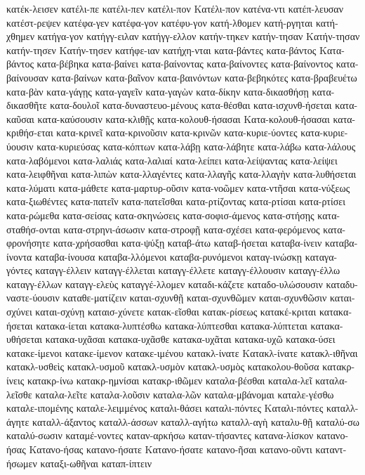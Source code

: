 {κατέκ-λεισεν
κατέλι-πε
κατέλι-πεν
κατέλι-πον
Κατέλι-πον
κατένα-ντι
κατέπ-λευσαν
κατέστ-ρεψεν
κατέφα-γεν
κατέφα-γον
κατέφυ-γον
κατή-λθομεν
κατή-ργηται
κατή-χθημεν
κατήγα-γον
κατήγγ-ειλαν
κατήγγ-ελλον
κατήν-τηκεν
κατήν-τησαν
Κατήν-τησαν
κατήν-τησεν
Κατήν-τησεν
κατήφε-ιαν
κατήχη-νται
κατα-βάντες
κατα-βάντος
Κατα-βάντος
κατα-βέβηκα
κατα-βαίνει
κατα-βαίνοντας
κατα-βαίνοντες
κατα-βαίνοντος
κατα-βαίνουσαν
κατα-βαίνων
κατα-βαῖνον
κατα-βαινόντων
κατα-βεβηκότες
κατα-βραβευέτω
κατα-βὰν
κατα-γάγῃς
κατα-γαγεῖν
κατα-γαγὼν
κατα-δίκην
κατα-δικασθήσῃ
κατα-δικασθῆτε
κατα-δουλοῖ
κατα-δυναστευο-μένους
κατα-θέσθαι
κατα-ισχυνθ-ήσεται
κατα-καῦσαι
κατα-καύσουσιν
κατα-κλιθῇς
κατα-κολουθ-ήσασαι
Κατα-κολουθ-ήσασαι
κατα-κριθήσ-εται
κατα-κρινεῖ
κατα-κρινοῦσιν
κατα-κρινῶν
κατα-κυριε-ύοντες
κατα-κυριε-ύουσιν
κατα-κυριεύσας
κατα-κόπτων
κατα-λάβῃ
κατα-λάβητε
κατα-λάβω
κατα-λάλους
κατα-λαβόμενοι
κατα-λαλιάς
κατα-λαλιαί
κατα-λείπει
κατα-λείψαντας
κατα-λείψει
κατα-λειφθῆναι
κατα-λιπὼν
κατα-λλαγέντες
κατα-λλαγῆς
κατα-λλαγὴν
κατα-λυθήσεται
κατα-λύματι
κατα-μάθετε
κατα-μαρτυρ-οῦσιν
κατα-νοῶμεν
κατα-ντῆσαι
κατα-νύξεως
κατα-ξιωθέντες
κατα-πατεῖν
κατα-πατεῖσθαι
κατα-ρτίζοντας
κατα-ρτίσαι
κατα-ρτίσει
κατα-ρώμεθα
κατα-σείσας
κατα-σκηνώσεις
κατα-σοφισ-άμενος
κατα-στήσῃς
κατα-σταθήσ-ονται
κατα-στρηνι-άσωσιν
κατα-στροφῇ
κατα-σχέσει
κατα-φερόμενος
κατα-φρονήσητε
κατα-χρήσασθαι
κατα-ψύξῃ
καταβ-άτω
καταβ-ήσεται
καταβα-ίνειν
καταβα-ίνοντα
καταβα-ίνουσα
καταβα-λλόμενοι
καταβα-ρυνόμενοι
καταγ-ινώσκῃ
καταγα-γόντες
καταγγ-έλλειν
καταγγ-έλλεται
καταγγ-έλλετε
καταγγ-έλλουσιν
καταγγ-έλλω
καταγγ-έλλων
καταγγ-ελεὺς
καταγγέ-λλομεν
καταδι-κάζετε
καταδο-υλώσουσιν
καταδυ-ναστε-ύουσιν
καταθε-ματίζειν
καται-σχυνθῇ
καται-σχυνθῶμεν
καται-σχυνθῶσιν
καται-σχύνει
καται-σχύνῃ
καταισ-χύνετε
κατακ-εῖσθαι
κατακ-ρίσεως
κατακέ-κριται
κατακα-ήσεται
κατακα-ίεται
κατακα-λυπτέσθω
κατακα-λύπτεσθαι
κατακα-λύπτεται
κατακα-υθήσεται
κατακα-υχᾶσαι
κατακα-υχᾶσθε
κατακα-υχᾶται
κατακα-υχῶ
κατακα-ύσει
κατακε-ίμενοι
κατακε-ίμενον
κατακε-ιμένου
κατακλ-ίνατε
Κατακλ-ίνατε
κατακλ-ιθῆναι
κατακλ-υσθεὶς
κατακλ-υσμοῦ
κατακλ-υσμὸν
κατακλ-υσμὸς
κατακολου-θοῦσα
κατακρ-ίνεις
κατακρ-ίνω
κατακρ-ημνίσαι
κατακρ-ιθῶμεν
καταλα-βέσθαι
καταλα-λεῖ
καταλα-λεῖσθε
καταλα-λεῖτε
καταλα-λοῦσιν
καταλα-λῶν
καταλα-μβάνομαι
καταλε-γέσθω
καταλε-ιπομένης
καταλε-λειμμένος
καταλι-θάσει
καταλι-πόντες
Καταλι-πόντες
καταλλ-άγητε
καταλλ-άξαντος
καταλλ-άσσων
καταλλ-αγήτω
καταλλ-αγὴ
καταλυ-θῇ
καταλύ-σω
καταλύ-σωσιν
καταμέ-νοντες
καταν-αρκήσω
καταν-τήσαντες
κατανα-λίσκον
κατανο-ήσας
Κατανο-ήσας
κατανο-ήσατε
Κατανο-ήσατε
κατανο-ῆσαι
κατανο-οῦντι
καταντ-ήσωμεν
καταξι-ωθῆναι
καταπ-ίπτειν
}
